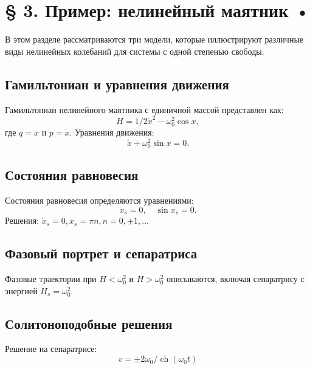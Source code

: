 \documentclass[10pt]{article}
\begin{document}
\section*{§ 3. Пример: нелинейный маятник •}
В этом разделе рассматриваются три модели, которые иллюстрируют различные виды нелинейных колебаний для системы с одной степенью свободы.

\subsection*{Гамильтониан и уравнения движения}
Гамильтониан нелинейного маятника с единичной массой представлен как:
\begin{equation*}
H=1 / 2 \dot{x}^{2}-\omega_{0}^{2} \cos x, \tag{3.1}
\end{equation*}
где $q=x$ и $p=\dot{x}$. Уравнения движения:
\begin{equation*}
\ddot{x}+\omega_{0}^{2} \sin x=0 . \tag{3.2}
\end{equation*}

\subsection*{Состояния равновесия}
Состояния равновесия определяются уравнениями:
\begin{equation*}
\dot{x}_{s}=0, \quad \sin x_{s}=0 . \tag{3.3}
\end{equation*}
Решения: $\dot{x}_{s}=0, x_{s}=\pi n, n=0, \pm 1, \ldots$

\subsection*{Фазовый портрет и сепаратриса}
Фазовые траектории при $H<\omega_{0}^{2}$ и $H>\omega_{0}^{2}$ описываются, включая сепаратрису с энергией $H_{s}=\omega_{0}^{2}$.

\subsection*{Солитоноподобные решения}
Решение на сепаратрисе:
\begin{equation*}
v= \pm 2 \omega_{0} / \operatorname{ch}\left(\omega_{0} t\right) \tag{3.7}
\end{equation*}
\end{document}
